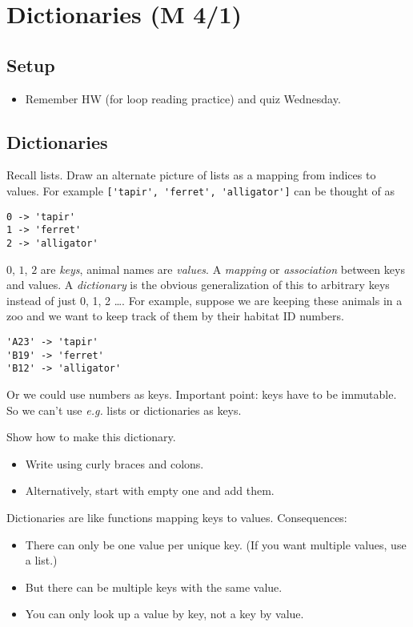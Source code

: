 \documentclass{article}
\newcommand{\eg}{\emph{e.g.}\xspace}
\newcommand{\ready}{\textcolor{Green}{\Checkmark}\xspace}
\begin{document}
\newpage
\section{\ready Dictionaries (M 4/1)}

\subsection*{Setup}

\begin{itemize}
\item Remember HW (for loop reading practice) and quiz Wednesday.
\end{itemize}

\subsection*{Dictionaries}

Recall lists.  Draw an alternate picture of lists as a mapping from
indices to values. For example \verb|['tapir', 'ferret', 'alligator']|
can be thought of as
\begin{verbatim}
0 -> 'tapir'
1 -> 'ferret'
2 -> 'alligator'
\end{verbatim}
$0$, $1$, $2$ are \emph{keys}, animal names are \emph{values}.  A
\emph{mapping} or \emph{association} between keys and values.  A
\emph{dictionary} is the obvious generalization of this to arbitrary
keys instead of just 0, 1, 2 \dots.  For example, suppose we are
keeping these animals in a zoo and we want to keep track of them by
their habitat ID numbers.
\begin{verbatim}
'A23' -> 'tapir'
'B19' -> 'ferret'
'B12' -> 'alligator'
\end{verbatim}
Or we could use numbers as keys.  Important point: keys have to be
immutable.  So we can't use \eg lists or dictionaries as keys.

Show how to make this dictionary.
\begin{itemize}
\item Write using curly braces and colons.
\item Alternatively, start with empty one and add them.
\end{itemize}

Dictionaries are like functions mapping keys to values.  Consequences:
\begin{itemize}
\item There can only be one value per unique key.  (If you want
  multiple values, use a list.)
\item But there can be multiple keys with the same value.
\item You can only look up a value by key, not a key by value.
\end{itemize}
\end{document}
